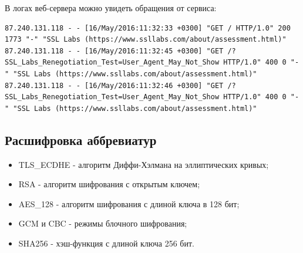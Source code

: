 В логах веб-сервера можно увидеть обращения от сервиса:

\begin{lstlisting}
87.240.131.118 - - [16/May/2016:11:32:33 +0300] "GET / HTTP/1.0" 200 1773 "-" "SSL Labs (https://www.ssllabs.com/about/assessment.html)"
87.240.131.118 - - [16/May/2016:11:32:45 +0300] "GET /?SSL_Labs_Renegotiation_Test=User_Agent_May_Not_Show HTTP/1.0" 400 0 "-" "SSL Labs (https://www.ssllabs.com/about/assessment.html)"
87.240.131.118 - - [16/May/2016:11:32:46 +0300] "GET /?SSL_Labs_Renegotiation_Test=User_Agent_May_Not_Show HTTP/1.0" 400 0 "-" "SSL Labs (https://www.ssllabs.com/about/assessment.html)"
\end{lstlisting}

\subsection{Расшифровка аббревиатур}
\begin{itemize}
	\item TLS\_ECDHE - алгоритм Диффи-Хэлмана на эллиптических кривых;
	\item RSA - алгоритм шифрования с открытым ключем;
	\item AES\_128 - алгоритм шифрования с длиной ключа в 128 бит;
	\item GCM и CBC - режимы блочного шифрования;
	\item SHA256 - хэш-функция с длиной ключа 256 бит.
\end{itemize}

